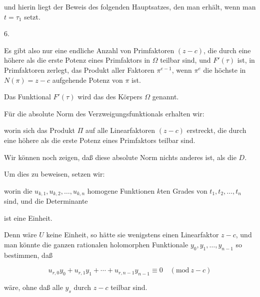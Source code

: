 
und hierin liegt der Beweis des folgenden Hauptsatzes, den man
erhält, wenn man $t = \tau_1$ setzt.

6. 

Es gibt also nur eine endliche Anzahl von Primfaktoren $(z-c)$, die
durch eine höhere als die erste Potenz eines Primfaktors in $\Omega$
teilbar sind, und $F'(\tau)$ ist, in Primfaktoren zerlegt, das
Produkt aller Faktoren $\pi^{e-1}$, wenn $\pi^e$ die höchste in
$N(\pi) = z - c$ aufgehende Potenz von $\pi$ ist.

Das Funktional $F'(\tau)$ wird das  des
Körpers $\Omega$ genannt.

Für die absolute Norm des Verzweigungsfunktionals erhalten wir:


worin sich das Produkt $\Pi$ auf alle Linearfaktoren $(z-c)$
erstreckt, die durch eine höhere als die erste Potenz eines
Primfaktors teilbar sind.

Wir können noch zeigen, daß diese absolute Norm nichts anderes ist,
als die  $D$.

Um dies zu beweisen, setzen wir:


worin die $u_{k,1}, u_{k,2}, \ldots, u_{k,n}$ homogene Funktionen
$k$ten Grades von $t_1, t_2, \ldots, t_n$ sind, und die Determinante


ist eine Einheit.

Denn wäre $U$ keine Einheit, so hätte sie wenigstens einen
Linearfaktor $z-c$, und man könnte die ganzen rationalen holomorphen
Funktionale $y_0, y_1, \ldots, y_{n-1}$ so bestimmen, daß

\[ u_{r,0}y_0 + u_{r,1}y_1 + \cdots + u_{r,n-1}y_{n-1} \equiv 0 \quad (\mathrm{mod}\ z-c) \]

wäre, ohne daß alle $y_s$ durch $z-c$ teilbar sind.
